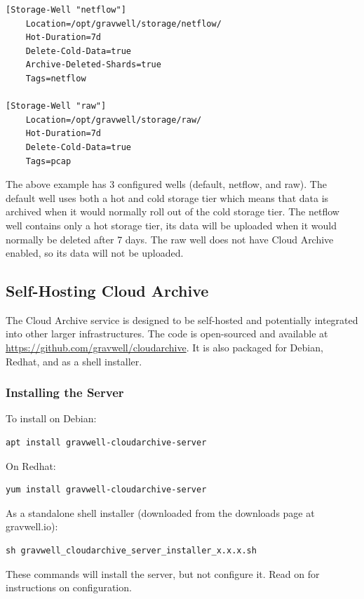 {{\begin{verbatim}
[Storage-Well "netflow"]
	Location=/opt/gravwell/storage/netflow/
	Hot-Duration=7d
	Delete-Cold-Data=true
	Archive-Deleted-Shards=true
	Tags=netflow

[Storage-Well "raw"]
	Location=/opt/gravwell/storage/raw/
	Hot-Duration=7d
	Delete-Cold-Data=true
	Tags=pcap
\end{verbatim}

The above example has 3 configured wells (default, netflow, and raw).  The default well uses both a hot and cold storage tier which means that data is archived when it would normally roll out of the cold storage tier.  The netflow well contains only a hot storage tier, its data will be uploaded when it would normally be deleted after 7 days.  The raw well does not have Cloud Archive enabled, so its data will not be uploaded.

\subsection{Self-Hosting Cloud Archive}

The Cloud Archive service is designed to be self-hosted and potentially integrated into other larger infrastructures. The code is open-sourced and available at \href{github.com/gravwell/cloudarchive}{https://github.com/gravwell/cloudarchive}. It is also packaged for Debian, Redhat, and as a shell installer.

\subsubsection{Installing the Server}
To install on Debian:

\begin{verbatim}
apt install gravwell-cloudarchive-server
\end{verbatim}

On Redhat:

\begin{verbatim}
yum install gravwell-cloudarchive-server
\end{verbatim}

As a standalone shell installer (downloaded from the downloads page at gravwell.io):

\begin{verbatim}
sh gravwell_cloudarchive_server_installer_x.x.x.sh
\end{verbatim}

These commands will install the server, but not configure it. Read on for instructions on configuration.

}}
